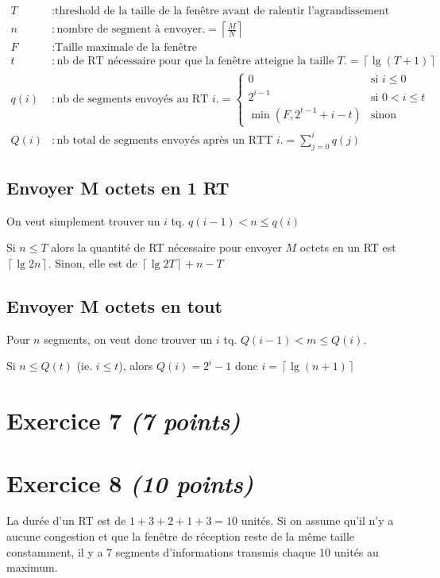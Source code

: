 \documentclass{article}
\begin{document}
\begin{align*}
    T &: \text{threshold de la taille de la fenêtre avant de ralentir l'agrandissement} \\
    n &: \text{nombre de segment à envoyer.} = \left\lceil \frac{M}{N} \right\rceil \\
    F &: \text{Taille maximale de la fenêtre} \\
    t &: \text{nb de RT nécessaire pour que la fenêtre atteigne la taille $T$.} = \left\lceil\lg(T+1)\right\rceil \\
    q(i) &: \text{nb de segments envoyés au RT $i$.} = 
    \left\{\begin{array}{ll}
         0 & \text{si } i\leq 0 \\
         2^{i-1} & \text{si } 0 < i \leq t \\
         \min(F, 2^{t-1}+i-t) & \text{sinon}
    \end{array}\right.\\
    Q(i) &: \text{nb total de segments envoyés après un RTT $i$.} = \displaystyle\sum_{j=0}^{i} q(j)
\end{align*}

\subsection{Envoyer M octets en 1 RT}
On veut simplement trouver un $i$ tq. $q(i-1) < n \leq q(i)$

Si $n \leq T$ alors la quantité de RT nécessaire pour envoyer $M$ octets en un RT est $\left\lceil\lg{2n}\right\rceil$.
Sinon, elle est de $\left\lceil\lg{2T}\right\rceil + n - T$

\subsection{Envoyer M octets en tout}
Pour $n$ segments, on veut donc trouver un $i$ tq. $Q(i-1) < m \leq Q(i)$.

Si $n \leq Q(t)$ (ie. $i \leq t$), alors $Q(i) = 2^i - 1$ donc $i = \left\lceil\lg(n+1)\right\rceil$

\clearpage

\section{Exercice 7 \emph{(7 points)}}

\clearpage

\section{Exercice 8 \emph{(10 points)}}
La durée d'un RT est de $1 + 3 + 2 + 1 + 3 = 10$ unités. Si on assume qu'il n'y a aucune congestion et que la fenêtre de réception reste de la même taille constamment, il y a $7$ segments d'informations transmis chaque 10 unités au maximum.
\end{document}
